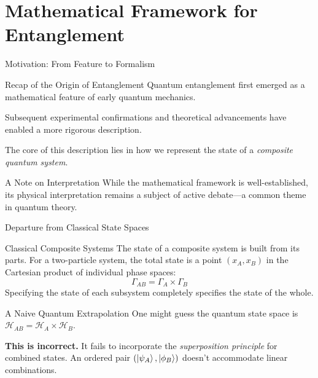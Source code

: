 \section{Mathematical Framework for Entanglement}


\begin{frame}{Motivation: From Feature to Formalism}
  \begin{block}{Recap of the Origin of Entanglement}
    Quantum entanglement first emerged as a mathematical feature of early
    quantum mechanics.
    \pause

    Subsequent experimental confirmations and theoretical advancements have
    enabled a more rigorous description.
    \pause

    The core of this description lies in how we represent the state of a
    \emph{composite quantum system}.
  \end{block}
  \pause

  \begin{alertblock}{A Note on Interpretation}
    While the mathematical framework is well-established, its physical
    interpretation remains a subject of active debate---a common theme in
    quantum theory.
  \end{alertblock}
\end{frame}


\begin{frame}{Departure from Classical State Spaces}
  \begin{block}{Classical Composite Systems}
    The state of a composite system is built from its parts. For a two-particle
    system, the total state is a point $(x_A, x_B)$ in the \alert{Cartesian
    product} of individual phase spaces:
    \[
      \Gamma_{AB} = \Gamma_A \times \Gamma_B
    \]
    Specifying the state of each subsystem completely specifies the state of the
    whole.
  \end{block}
  \pause
  \begin{alertblock}{A Naive Quantum Extrapolation}
    One might guess the quantum state space is $\mathcal{H}_{AB} = \mathcal{H}_A
    \times \mathcal{H}_B$.
    \pause

    \textbf{This is incorrect.} It fails to incorporate the \emph{superposition
    principle} for combined states. An ordered pair $(\ket{\psi_A},
    \ket{\phi_B})$ doesn't accommodate linear combinations.
  \end{alertblock}
\end{frame}


